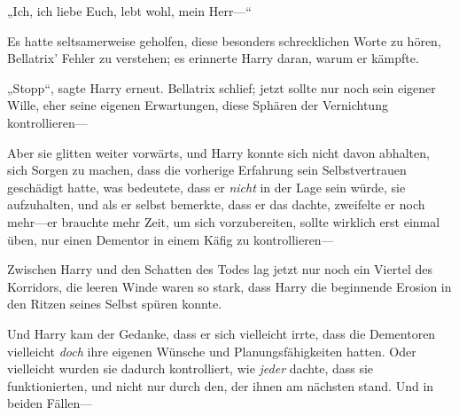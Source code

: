 „Ich, ich liebe Euch, lebt wohl, mein Herr—“


Es hatte seltsamerweise geholfen, diese besonders schrecklichen Worte zu hören, Bellatrix’ Fehler zu verstehen; es erinnerte Harry daran, warum er kämpfte.

„Stopp“, sagte Harry erneut. Bellatrix schlief; jetzt sollte nur noch sein eigener Wille, eher seine eigenen Erwartungen, diese Sphären der Vernichtung kontrollieren—

Aber sie glitten weiter vorwärts, und Harry konnte sich nicht davon abhalten, sich Sorgen zu machen, dass die vorherige Erfahrung sein Selbstvertrauen geschädigt hatte, was bedeutete, dass er \emph{nicht} in der Lage sein würde, sie aufzuhalten, und als er selbst bemerkte, dass er das dachte, zweifelte er noch mehr—er brauchte mehr Zeit, um sich vorzubereiten, sollte wirklich erst einmal üben, nur einen Dementor in einem Käfig zu kontrollieren—

Zwischen Harry und den Schatten des Todes lag jetzt nur noch ein Viertel des Korridors, die leeren Winde waren so stark, dass Harry die beginnende Erosion in den Ritzen seines Selbst spüren konnte.

Und Harry kam der Gedanke, dass er sich vielleicht irrte, dass die Dementoren vielleicht \emph{doch} ihre eigenen Wünsche und Planungsfähigkeiten hatten. Oder vielleicht wurden sie dadurch kontrolliert, wie \emph{jeder} dachte, dass sie funktionierten, und nicht nur durch den, der ihnen am nächsten stand. Und in beiden Fällen—

